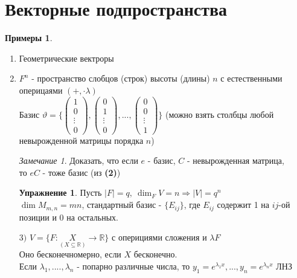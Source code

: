 \documentclass[a4paper, 12pt]{article}
\newcommand{\R}{\mathbb R}
\newcommand\tab[1][.5cm]{\hspace*{#1}}
\theoremstyle{definition}
\newtheorem*{example}{Примеры}
\newtheorem*{exercise}{Упражнение}
\theoremstyle{plain}
\theoremstyle{remark}
\newtheorem*{remark}{Замечание}
\begin{document}
  \section{Векторные подпространства}
  \begin{example} \tab
    \begin{enumerate}
      \item Геометрические вектроры
      \item $F^n$ - пространство слобцов (строк) высоты (длины) $n$ с естественными оперицаями $(+, \cdot \lambda)$ \vspace{0.4cm}\\
      Базис $\vartheta  = \Bigg\{ \begin{pmatrix}
        1 \\ 0 \\ \vdots \\ 0
      \end{pmatrix}, \begin{pmatrix}
        0 \\ 1 \\ \vdots \\ 0
      \end{pmatrix}, ... , \begin{pmatrix}
        0 \\ 0 \\ \vdots \\ 1
      \end{pmatrix} \Bigg\}$ (можно взять столбцы любой\vspace{0.3cm}\\ невырожденной матрицы порядка $n$)
      \begin{remark}
        Доказать, что если $e$ - базис, $C$ - невырожденная матрица,\\ то $eC$ - тоже базис (из \textbf{(2)})
      \end{remark} 
      \begin{exercise}
        Пусть $|F| = q, \ \dim_F V = n \Longrightarrow |V| = q^n$\\
        $\dim M_{m,n} = mn$, стандартный базис - $\{E_{ij}\}$, где $E_{ij}$ содержит 1 на $ij$-ой позиции и $0$ на остальных.  
      \end{exercise}
      \item[$3)$] $V = \{F:\underset{(X\subseteq \R)}{X} \to \R\}$ с оперициями сложения и $\lambda F$\\
      Оно бесконечномерно, если $X$ бесконечно.\\
      Если $\lambda_1, ...., \lambda_n$ - попарно различные числа, то $y_1 = e^{\lambda_1x},..., y_n = e^{\lambda_nx}$ ЛНЗ\\

\end{enumerate}
\end{example}
\end{document}
